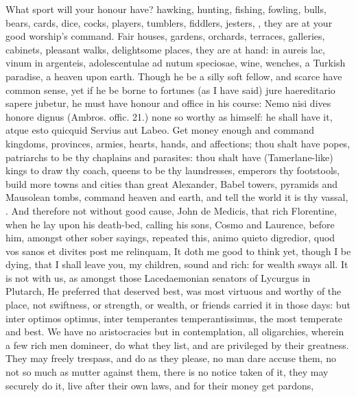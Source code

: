 {What sport will your honour have? hawking, hunting, fishing, fowling,
bulls, bears, cards, dice, cocks, players, tumblers, fiddlers, jesters,
\etc{}, they are at your good worship's command. Fair houses, gardens,
orchards, terraces, galleries, cabinets, pleasant walks, delightsome
places, they are at hand: in aureis lac, vinum in argenteis,
adolescentulae ad nutum speciosae, wine, wenches, \etc{} a Turkish
paradise, a heaven upon earth. Though he be a silly soft fellow, and
scarce have common sense, yet if he be borne to fortunes (as I have
said) jure haereditario sapere jubetur, he must have honour and
office in his course: Nemo nisi dives honore dignus (Ambros.
offic. 21.) none so worthy as himself: he shall have it, atque esto
quicquid Servius aut Labeo. Get money enough and command
kingdoms, provinces, armies, hearts, hands, and affections; thou
shalt have popes, patriarchs to be thy chaplains and parasites: thou
shalt have (Tamerlane-like) kings to draw thy coach, queens to be thy
laundresses, emperors thy footstools, build more towns and cities than
great Alexander, Babel towers, pyramids and Mausolean tombs, \etc{}
command heaven and earth, and tell the world it is thy vassal, . And therefore not without good
cause, John de Medicis, that rich Florentine, when he lay upon his
death-bed, calling his sons, Cosmo and Laurence, before him, amongst
other sober sayings, repeated this, animo quieto digredior, quod vos
sanos et divites post me relinquam, It doth me good to think yet,
though I be dying, that I shall leave you, my children, sound and rich:
for wealth sways all. It is not with us, as amongst those Lacedaemonian
senators of Lycurgus in Plutarch, He preferred that deserved best, was
most virtuous and worthy of the place, not swiftness, or
strength, or wealth, or friends carried it in those days: but inter
optimos optimus, inter temperantes temperantissimus, the most temperate
and best. We have no aristocracies but in contemplation, all
oligarchies, wherein a few rich men domineer, do what they list, and
are privileged by their greatness. They may freely trespass, and
do as they please, no man dare accuse them, no not so much as mutter
against them, there is no notice taken of it, they may securely do it,
live after their own laws, and for their money get pardons,
}
